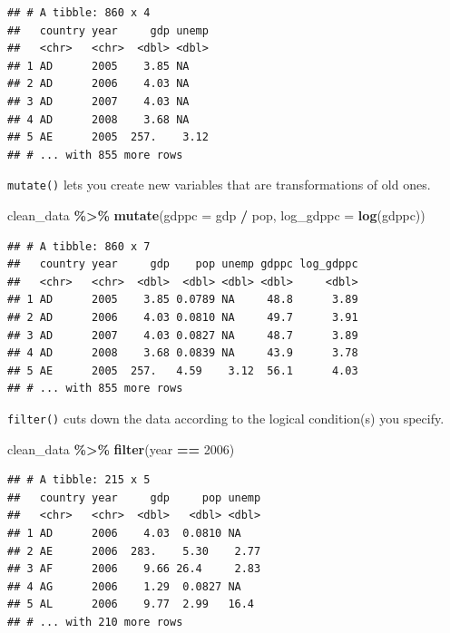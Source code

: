 \documentclass[
  12pt,
  oneside,openany]{book}
\newenvironment{Shaded}{\begin{snugshade}}{\end{snugshade}}
\newcommand{\DataTypeTok}[1]{\textcolor[rgb]{0.13,0.29,0.53}{#1}}
\newcommand{\DecValTok}[1]{\textcolor[rgb]{0.00,0.00,0.81}{#1}}
\newcommand{\KeywordTok}[1]{\textcolor[rgb]{0.13,0.29,0.53}{\textbf{#1}}}
\newcommand{\NormalTok}[1]{#1}
\newcommand{\OperatorTok}[1]{\textcolor[rgb]{0.81,0.36,0.00}{\textbf{#1}}}
\newcommand{\StringTok}[1]{\textcolor[rgb]{0.31,0.60,0.02}{#1}}
\begin{document}
\begin{verbatim}
## # A tibble: 860 x 4
##   country year     gdp unemp
##   <chr>   <chr>  <dbl> <dbl>
## 1 AD      2005    3.85 NA   
## 2 AD      2006    4.03 NA   
## 3 AD      2007    4.03 NA   
## 4 AD      2008    3.68 NA   
## 5 AE      2005  257.    3.12
## # ... with 855 more rows
\end{verbatim}

\texttt{mutate()} lets you create new variables that are transformations of old ones.

\begin{Shaded}
\begin{Highlighting}[]
\NormalTok{clean\_data }\OperatorTok{\%>\%}
\StringTok{  }\KeywordTok{mutate}\NormalTok{(}\DataTypeTok{gdppc =}\NormalTok{ gdp }\OperatorTok{/}\StringTok{ }\NormalTok{pop,}
         \DataTypeTok{log\_gdppc =} \KeywordTok{log}\NormalTok{(gdppc))}
\end{Highlighting}
\end{Shaded}

\begin{verbatim}
## # A tibble: 860 x 7
##   country year     gdp    pop unemp gdppc log_gdppc
##   <chr>   <chr>  <dbl>  <dbl> <dbl> <dbl>     <dbl>
## 1 AD      2005    3.85 0.0789 NA     48.8      3.89
## 2 AD      2006    4.03 0.0810 NA     49.7      3.91
## 3 AD      2007    4.03 0.0827 NA     48.7      3.89
## 4 AD      2008    3.68 0.0839 NA     43.9      3.78
## 5 AE      2005  257.   4.59    3.12  56.1      4.03
## # ... with 855 more rows
\end{verbatim}

\texttt{filter()} cuts down the data according to the logical condition(s) you specify.

\begin{Shaded}
\begin{Highlighting}[]
\NormalTok{clean\_data }\OperatorTok{\%>\%}
\StringTok{  }\KeywordTok{filter}\NormalTok{(year }\OperatorTok{==}\StringTok{ }\DecValTok{2006}\NormalTok{)}
\end{Highlighting}
\end{Shaded}

\begin{verbatim}
## # A tibble: 215 x 5
##   country year     gdp     pop unemp
##   <chr>   <chr>  <dbl>   <dbl> <dbl>
## 1 AD      2006    4.03  0.0810 NA   
## 2 AE      2006  283.    5.30    2.77
## 3 AF      2006    9.66 26.4     2.83
## 4 AG      2006    1.29  0.0827 NA   
## 5 AL      2006    9.77  2.99   16.4 
## # ... with 210 more rows
\end{verbatim}
\end{document}
